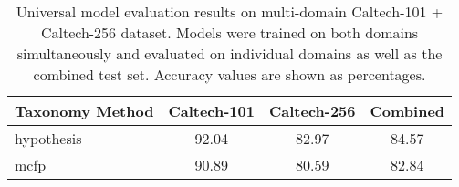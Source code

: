 \begin{table}[ht]
\centering
\caption{Universal model evaluation results on multi-domain Caltech-101 + Caltech-256 dataset. Models were trained on both domains simultaneously and evaluated on individual domains as well as the combined test set. Accuracy values are shown as percentages.}
\label{tab:universal_model_results}
\begin{tabular}{lccc}
\toprule
Taxonomy Method & Caltech-101 & Caltech-256 & Combined \\
\midrule
hypothesis & 92.04 & 82.97 & 84.57 \\
mcfp & 90.89 & 80.59 & 82.84 \\
\bottomrule
\end{tabular}
\end{table}
